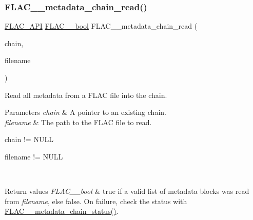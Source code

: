 \subsubsection{\texorpdfstring{F\+L\+A\+C\+\_\+\+\_\+metadata\+\_\+chain\+\_\+read()}{FLAC\_\_metadata\_chain\_read()}}
{\footnotesize\ttfamily \hyperlink{group__flac__export_ga56ca07df8a23310707732b1c0007d6f5}{F\+L\+A\+C\+\_\+\+A\+PI} \hyperlink{ordinals_8h_a95103469f1cbd78b8cf250194985b34e}{F\+L\+A\+C\+\_\+\+\_\+bool} F\+L\+A\+C\+\_\+\+\_\+metadata\+\_\+chain\+\_\+read (\begin{DoxyParamCaption}\item[{\hyperlink{group__flac__metadata__level2_gaec6993c60b88f222a52af86f8f47bfdf}{F\+L\+A\+C\+\_\+\+\_\+\+Metadata\+\_\+\+Chain} $\ast$}]{chain,  }\item[{\hyperlink{zconf_8h_a2c212835823e3c54a8ab6d95c652660e}{const} char $\ast$}]{filename }\end{DoxyParamCaption})}

Read all metadata from a F\+L\+AC file into the chain.


\begin{DoxyParams}{Parameters}
{\em chain} & A pointer to an existing chain. \\
\hline
{\em filename} & The path to the F\+L\+AC file to read.  
\begin{DoxyCode}
chain != NULL 
\end{DoxyCode}
 
\begin{DoxyCode}
filename != NULL 
\end{DoxyCode}
 \\
\hline
\end{DoxyParams}

\begin{DoxyRetVals}{Return values}
{\em F\+L\+A\+C\+\_\+\+\_\+bool} & {\ttfamily true} if a valid list of metadata blocks was read from {\itshape filename}, else {\ttfamily false}. On failure, check the status with \hyperlink{group__flac__metadata__level2_ga3d030e216a6517f23372bb76f0639127}{F\+L\+A\+C\+\_\+\+\_\+metadata\+\_\+chain\+\_\+status()}. \\
\hline
\end{DoxyRetVals}
\mbox{\label{group__flac__metadata__level2_gae7b34f2929bedea0e14ac14aca253a40}} 
